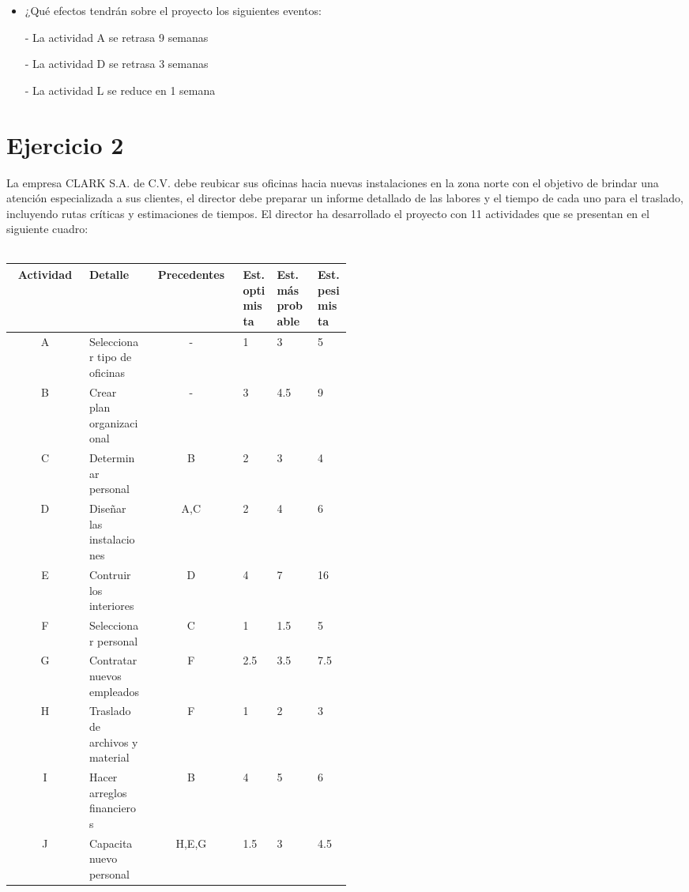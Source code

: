 \documentclass[12pt]{article}
\begin{document}
\begin{itemize}
    \item ¿Qué efectos tendrán sobre el proyecto los siguientes eventos:

    - La actividad A se retrasa 9 semanas

    - La actividad D se retrasa 3 semanas

    - La actividad L se reduce en 1 semana

\end{itemize}

\section{Ejercicio 2}

La empresa CLARK S.A. de C.V. debe reubicar sus oficinas hacia nuevas
instalaciones en la zona norte con el objetivo de brindar una atención
especializada a sus clientes, el director debe preparar un informe detallado de
las labores y el tiempo de cada uno para el traslado, incluyendo rutas críticas
y estimaciones de tiempos. El director ha desarrollado el proyecto con 11
actividades que se presentan en el siguiente cuadro: \\
\\
\begin{center}
  \begin{tabular}{cp{0.18\linewidth}cp{0.1\linewidth}p{0.12\linewidth}p{0.1\linewidth}}
    Actividad   &    Detalle    &   Precedentes & Est. optimista  & Est.
    más probable    &   Est. pesimista    \\
    \hline
      A  & Seleccionar tipo de oficinas & -      &  1    &  3   &  5  \\
      B  & Crear plan organizacional    & -      &  3    &  4.5 &  9  \\ 
      C  & Determinar personal          & B      &  2    &  3   &  4  \\ 
      D  & Diseñar las instalaciones    & A,C    &  2    &  4   &  6  \\ 
      E  & Contruir los interiores      & D      &  4    &  7   &  16 \\
      F  & Seleccionar personal         & C      &  1    &  1.5 &  5  \\
      G  & Contratar nuevos empleados   & F      &  2.5  &  3.5 &  7.5\\
      H  & Traslado de archivos y material & F      &  1    &  2   &  3  \\
      I  & Hacer arreglos financieros   & B      &  4    &  5   &  6  \\
      J  & Capacita nuevo personal      & H,E,G  &  1.5  &  3   &  4.5
  \end{tabular}
\end{center}
\end{document}

